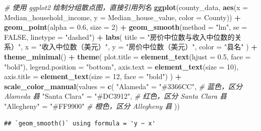 \documentclass[
]{article}
\newenvironment{Shaded}{\begin{snugshade}}{\end{snugshade}}
\newcommand{\AttributeTok}[1]{\textcolor[rgb]{0.13,0.29,0.53}{#1}}
\newcommand{\CommentTok}[1]{\textcolor[rgb]{0.56,0.35,0.01}{\textit{#1}}}
\newcommand{\ConstantTok}[1]{\textcolor[rgb]{0.56,0.35,0.01}{#1}}
\newcommand{\DecValTok}[1]{\textcolor[rgb]{0.00,0.00,0.81}{#1}}
\newcommand{\FloatTok}[1]{\textcolor[rgb]{0.00,0.00,0.81}{#1}}
\newcommand{\FunctionTok}[1]{\textcolor[rgb]{0.13,0.29,0.53}{\textbf{#1}}}
\newcommand{\NormalTok}[1]{#1}
\newcommand{\OtherTok}[1]{\textcolor[rgb]{0.56,0.35,0.01}{#1}}
\newcommand{\SpecialCharTok}[1]{\textcolor[rgb]{0.81,0.36,0.00}{\textbf{#1}}}
\newcommand{\StringTok}[1]{\textcolor[rgb]{0.31,0.60,0.02}{#1}}
\begin{document}
\begin{Shaded}
\begin{Highlighting}[]
\CommentTok{\# 使用 ggplot2 绘制分组散点图，直接引用列名}
\FunctionTok{ggplot}\NormalTok{(county\_data, }\FunctionTok{aes}\NormalTok{(}\AttributeTok{x =}\NormalTok{ Median\_household\_income, }\AttributeTok{y =}\NormalTok{ Median\_house\_value, }\AttributeTok{color =}\NormalTok{ County)) }\SpecialCharTok{+}
  \FunctionTok{geom\_point}\NormalTok{(}\AttributeTok{alpha =} \FloatTok{0.6}\NormalTok{, }\AttributeTok{size =} \DecValTok{2}\NormalTok{) }\SpecialCharTok{+}  
  \FunctionTok{geom\_smooth}\NormalTok{(}\AttributeTok{method =} \StringTok{"lm"}\NormalTok{, }\AttributeTok{se =} \ConstantTok{FALSE}\NormalTok{, }\AttributeTok{linetype =} \StringTok{"dashed"}\NormalTok{) }\SpecialCharTok{+}  
  \FunctionTok{labs}\NormalTok{(}
    \AttributeTok{title =} \StringTok{"房价中位数与收入中位数的关系）"}\NormalTok{,}
    \AttributeTok{x =} \StringTok{"收入中位数（美元）"}\NormalTok{,}
    \AttributeTok{y =} \StringTok{"房价中位数（美元）"}\NormalTok{,}
    \AttributeTok{color =} \StringTok{"县名"}
\NormalTok{  ) }\SpecialCharTok{+}
  \FunctionTok{theme\_minimal}\NormalTok{() }\SpecialCharTok{+}  
  \FunctionTok{theme}\NormalTok{(}
    \AttributeTok{plot.title =} \FunctionTok{element\_text}\NormalTok{(}\AttributeTok{hjust =} \FloatTok{0.5}\NormalTok{, }\AttributeTok{face =} \StringTok{"bold"}\NormalTok{), }
    \AttributeTok{legend.position =} \StringTok{"bottom"}\NormalTok{,  }
    \AttributeTok{axis.text =} \FunctionTok{element\_text}\NormalTok{(}\AttributeTok{size =} \DecValTok{10}\NormalTok{), }
    \AttributeTok{axis.title =} \FunctionTok{element\_text}\NormalTok{(}\AttributeTok{size =} \DecValTok{12}\NormalTok{, }\AttributeTok{face =} \StringTok{"bold"}\NormalTok{) }
\NormalTok{  ) }\SpecialCharTok{+}
  \FunctionTok{scale\_color\_manual}\NormalTok{(}\AttributeTok{values =} \FunctionTok{c}\NormalTok{(}
    \StringTok{"Alameda"} \OtherTok{=} \StringTok{"\#3366CC"}\NormalTok{,      }\CommentTok{\# 蓝色，区分 Alameda 县}
    \StringTok{"Santa Clara"} \OtherTok{=} \StringTok{"\#DC3912"}\NormalTok{,  }\CommentTok{\# 红色，区分 Santa Clara 县}
    \StringTok{"Allegheny"} \OtherTok{=} \StringTok{"\#FF9900"}    \CommentTok{\# 橙色，区分 Allegheny 县}
\NormalTok{  ))}
\end{Highlighting}
\end{Shaded}

\begin{verbatim}
## `geom_smooth()` using formula = 'y ~ x'
\end{verbatim}
\end{document}
